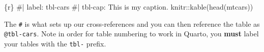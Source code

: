 \documentclass[
  letterpaper,
  11pt,
  spanish,
  singlespacing,
  headsepline]{MastersDoctoralThesis}
\newenvironment{Shaded}{\begin{snugshade}}{\end{snugshade}}
\newcommand{\CommentTok}[1]{\textcolor[rgb]{0.37,0.37,0.37}{#1}}
\newcommand{\FunctionTok}[1]{\textcolor[rgb]{0.28,0.35,0.67}{#1}}
\newcommand{\InformationTok}[1]{\textcolor[rgb]{0.37,0.37,0.37}{#1}}
\newcommand{\NormalTok}[1]{\textcolor[rgb]{0.00,0.23,0.31}{#1}}
\newcommand{\SpecialCharTok}[1]{\textcolor[rgb]{0.37,0.37,0.37}{#1}}
\begin{document}
\begin{Shaded}
\begin{Highlighting}[]
\InformationTok{\textasciigrave{}\textasciigrave{}\textasciigrave{}\{r\}}
\CommentTok{\#| label: tbl{-}cars}
\CommentTok{\#| tbl{-}cap: This is my caption.}
\NormalTok{knitr}\SpecialCharTok{::}\FunctionTok{kable}\NormalTok{(}\FunctionTok{head}\NormalTok{(mtcars))}
\InformationTok{\textasciigrave{}\textasciigrave{}\textasciigrave{}}
\end{Highlighting}
\end{Shaded}

The \texttt{\#\textbar{}} is what sets up our cross-references and you
can then reference the table as \texttt{@tbl-cars}. Note in order for
table numbering to work in Quarto, you \textbf{must} label your tables
with the \texttt{tbl-} prefix.
\end{document}
